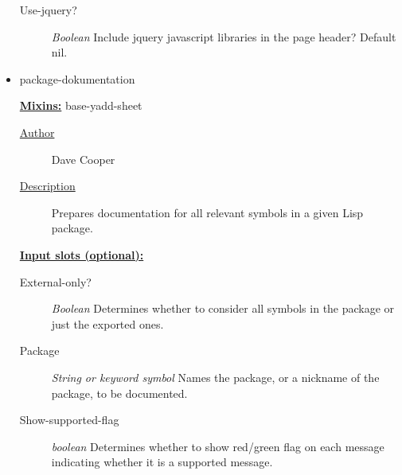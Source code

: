 \documentclass [11pt]{book}
\begin{document}
\begin{itemize}
\begin{description}
\item [Use-jquery?]
\emph{Boolean} Include jquery javascript libraries in the page header?
Default nil.


\end{description}







\item {}package-dokumentation


\textbf{
\underline{Mixins:}} base-yadd-sheet





\begin{description}

\item [
\underline{Author}]


Dave Cooper



\item [
\underline{Description}]


Prepares documentation for all relevant symbols in a given Lisp package.



\end{description}








\textbf{
\underline{Input slots (optional):}}

\begin{description}

\item [External-only?]
\emph{Boolean} Determines whether to consider all symbols in the package or just the exported ones.


\item [Package]
\emph{String or keyword symbol} Names the package, or a nickname of the package, to be documented.


\item [Show-supported-flag]
\emph{boolean} Determines whether to show red/green flag on each message indicating whether it is a
supported message.


\end{description}







\end{itemize}
\end{document}
